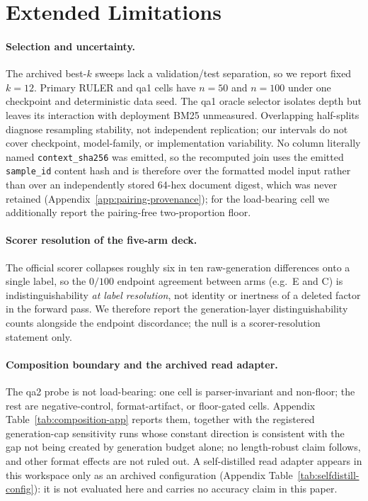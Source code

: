 \FloatBarrier

\section{Extended Limitations}
\label{app:extended-limitations}

\paragraph{Selection and uncertainty.}
The archived best-$k$ sweeps lack a validation/test separation, so we report
fixed $k=12$.  Primary RULER and qa1 cells have $n=50$ and $n=100$ under one
checkpoint and deterministic data seed.  The qa1 oracle selector isolates
depth but leaves its interaction with deployment BM25 unmeasured.  Overlapping
half-splits diagnose resampling stability, not independent replication; our
intervals do not cover checkpoint, model-family, or implementation variability.
No column literally named \texttt{context\_sha256} was emitted, so the
recomputed join uses the emitted \texttt{sample\_id} content hash and is
therefore over the formatted model input rather than over an independently
stored 64-hex document digest, which was never retained
(Appendix~\ref{app:pairing-provenance}); for the load-bearing cell we
additionally report the pairing-free two-proportion floor.

\paragraph{Scorer resolution of the five-arm deck.}
The official scorer collapses roughly six in ten raw-generation differences onto
a single label, so the $0/100$ endpoint agreement between arms (e.g.\ E and C) is
indistinguishability \emph{at label resolution}, not identity or inertness of a
deleted factor in the forward pass.  We therefore report the generation-layer
distinguishability counts alongside the endpoint discordance; the null is a
scorer-resolution statement only.

\paragraph{Composition boundary and the archived read adapter.}
The qa2 probe is not load-bearing: one cell is parser-invariant and non-floor;
the rest are negative-control, format-artifact, or floor-gated cells.  Appendix
Table~\ref{tab:composition-app} reports them, together with the registered
generation-cap sensitivity runs whose constant direction is consistent with the
gap not being created by generation budget alone; no length-robust claim
follows, and other format effects are not ruled out.  A self-distilled read
adapter appears in this workspace only as an archived configuration
(Appendix Table~\ref{tab:selfdistill-config}): it is not evaluated here and
carries no accuracy claim in this paper.
